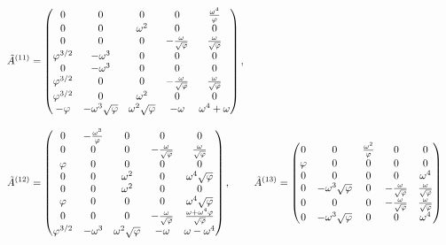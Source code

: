 \begin{align}
  \tilde{A}^{(11)} &= \begin{pmatrix}
    0 & 0 & 0 & 0 & \frac{\omega^4}{\varphi} \\
    0 & 0 & \omega^2 & 0 & 0 \\
    0 & 0 & 0 & -\frac{\omega}{\sqrt{\varphi}} & \frac{\omega}{\sqrt{\varphi}} \\
    \varphi^{3/2} & -\omega^3 & 0 & 0 & 0 \\
    0 & -\omega^3 & 0 & 0 & 0 \\
    \varphi^{3/2} & 0 & 0 & -\frac{\omega}{\sqrt{\varphi}} & \frac{\omega}{\sqrt{\varphi}} \\
    \varphi^{3/2} & 0 & \omega^2 & 0 & 0 \\
    -\varphi & -\omega^3\sqrt{\varphi} & \omega^2 \sqrt{\varphi} & -\omega & \omega^4+\omega \\
  \end{pmatrix}, \notag \\[2ex]
  \tilde{A}^{(12)} &= \begin{pmatrix}
    0 & -\frac{\omega^3}{\varphi} & 0 & 0 & 0 \\
    0 & 0 & 0 & -\frac{\omega}{\sqrt{\varphi}} & \frac{\omega}{\sqrt{\varphi}} \\
    \varphi & 0 & 0 & 0 & 0 \\
    0 & 0 & \omega^2 & 0 & \omega^4 \sqrt{\varphi} \\
    0 & 0 & \omega^2 & 0 & 0 \\
    \varphi & 0 & 0 & 0 & \omega^4 \sqrt{\varphi} \\
    0 & 0 & 0 & -\frac{\omega}{\sqrt{\varphi}} & \frac{\omega+\omega^4 \varphi}{\sqrt{\varphi}} \\
    \varphi^{3/2} & -\omega^3 & \omega^2 \sqrt{\varphi} & -\omega & \omega-\omega^4 \\
  \end{pmatrix}, &
  \tilde{A}^{(13)} &= \begin{pmatrix}
    0 & 0 & \frac{\omega^2}{\varphi} & 0 & 0 \\
    \varphi & 0 & 0 & 0 & 0 \\
    0 & 0 & 0 & 0 & \omega^4 \\
    0 & -\omega^3\sqrt{\varphi} & 0 & -\frac{\omega}{\sqrt{\varphi}} & \frac{\omega}{\sqrt{\varphi}} \\
    0 & 0 & 0 & -\frac{\omega}{\sqrt{\varphi}} & \frac{\omega}{\sqrt{\varphi}} \\
    0 & -\omega^3\sqrt{\varphi} & 0 & 0 & \omega^4 \\

\end{pmatrix}
\end{align}
